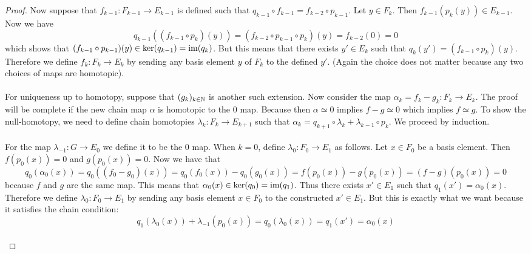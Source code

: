 \documentclass[a4paper]{article}
\begin{document}
\begin{prp}{}{}
\begin{proof}
Now suppose that $f_{k-1}:F_{k-1}\to E_{k-1}$ is defined such that $q_{k-1}\circ f_{k-1}=f_{k-2}\circ p_{k-1}$. Let $y\in F_k$. Then $f_{k-1}(p_k(y))\in E_{k-1}$. Now we have $$q_{k-1}((f_{k-1}\circ p_k)(y))=(f_{k-2}\circ p_{k-1}\circ p_k)(y)=f_{k-2}(0)=0$$ which shows that $(f_{k-1}\circ p_{k-1})(y)\in\ker(q_{k-1})=\operatorname{im}(q_k)$. But this means that there exists $y'\in E_k$ such that $q_k(y')=(f_{k-1}\circ p_k)(y)$. Therefore we define $f_k:F_k\to E_k$ by sending any basis element $y$ of $F_k$ to the defined $y'$. (Again the choice does not matter because any two choices of maps are homotopic). \\~\\

For uniqueness up to homotopy, suppose that $(g_k)_{k\in\mathbb{N}}$ is another such extension. Now consider the map $\alpha_k=f_k-g_k:F_k\to E_k$. The proof will be complete if the new chain map $\alpha$ is homotopic to the $0$ map. Because then $\alpha\simeq 0$ implies $f-g\simeq 0$ which implies $f\simeq g$. To show the null-homotopy, we need to define chain homotopies $\lambda_k:F_k\to E_{k+1}$ such that $\alpha_k=q_{k+1}\circ\lambda_k+\lambda_{k-1}\circ p_k$. We proceed by induction. \\~\\

For the map $\lambda_{-1}:G\to E_0$ we define it to be the $0$ map. When $k=0$, define $\lambda_0:F_0\to E_1$ as follows. Let $x\in F_0$ be a basis element. Then $f(p_0(x))=0$ and $g(p_0(x))=0$. Now we have that $$q_0(\alpha_0(x))=q_0((f_0-g_0)(x))=q_0(f_0(x))-q_0(g_0(x))=f(p_0(x))-g(p_0(x))=(f-g)(p_0(x))=0$$ because $f$ and $g$ are the same map. This means that $\alpha_0(x)\in\ker(q_0)=\operatorname{im}(q_1)$. Thus there exists $x'\in E_1$ such that $q_1(x')=\alpha_0(x)$. Therefore we define $\lambda_0:F_0\to E_1$ by sending any basis element $x\in F_0$ to the constructed $x'\in E_1$. But this is exactly what we want because it satisfies the chain condition: $$q_1(\lambda_0(x))+\lambda_{-1}(p_0(x))=q_0(\lambda_0(x))=q_1(x')=\alpha_0(x)$$~\\


\end{proof}
\end{prp}
\end{document}
